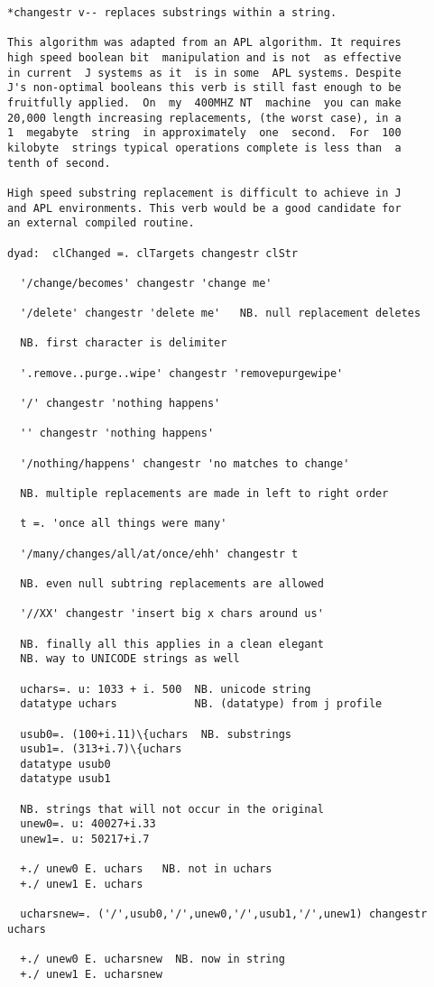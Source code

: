 \documentclass[11pt,letter,landscape]{article}
\begin{document}
    \begin{Verbatim}[commandchars=\\\{\}]
*changestr v-- replaces substrings within a string.

This algorithm was adapted from an APL algorithm. It requires
high speed boolean bit  manipulation and is not  as effective
in current  J systems as it  is in some  APL systems. Despite
J's non-optimal booleans this verb is still fast enough to be
fruitfully applied.  On  my  400MHZ NT  machine  you can make
20,000 length increasing replacements, (the worst case), in a
1  megabyte  string  in approximately  one  second.  For  100
kilobyte  strings typical operations complete is less than  a
tenth of second.

High speed substring replacement is difficult to achieve in J
and APL environments. This verb would be a good candidate for
an external compiled routine.

dyad:  clChanged =. clTargets changestr clStr

  '/change/becomes' changestr 'change me'

  '/delete' changestr 'delete me'   NB. null replacement deletes

  NB. first character is delimiter

  '.remove..purge..wipe' changestr 'removepurgewipe'

  '/' changestr 'nothing happens'

  '' changestr 'nothing happens'

  '/nothing/happens' changestr 'no matches to change'

  NB. multiple replacements are made in left to right order

  t =. 'once all things were many'

  '/many/changes/all/at/once/ehh' changestr t

  NB. even null subtring replacements are allowed

  '//XX' changestr 'insert big x chars around us'

  NB. finally all this applies in a clean elegant
  NB. way to UNICODE strings as well

  uchars=. u: 1033 + i. 500  NB. unicode string
  datatype uchars            NB. (datatype) from j profile

  usub0=. (100+i.11)\{uchars  NB. substrings
  usub1=. (313+i.7)\{uchars
  datatype usub0
  datatype usub1

  NB. strings that will not occur in the original
  unew0=. u: 40027+i.33
  unew1=. u: 50217+i.7

  +./ unew0 E. uchars   NB. not in uchars
  +./ unew1 E. uchars

  ucharsnew=. ('/',usub0,'/',unew0,'/',usub1,'/',unew1) changestr uchars

  +./ unew0 E. ucharsnew  NB. now in string
  +./ unew1 E. ucharsnew




    \end{Verbatim}
\end{document}
